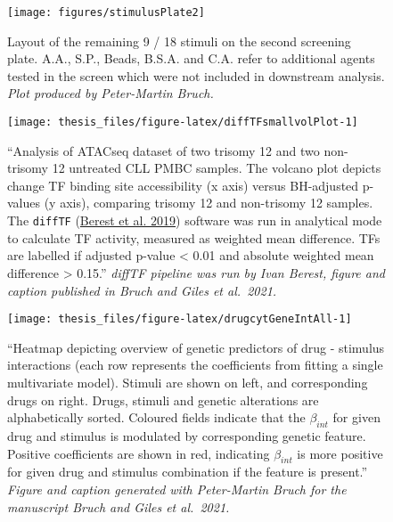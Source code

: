\documentclass[11pt, a4paper, twosided]{book}
\begin{document}
\begin{figure}

{\centering \texttt{[image: figures/stimulusPlate2]} 

}

\caption{Layout of the remaining 9 / 18 stimuli on the second screening plate. A.A., S.P., Beads, B.S.A. and C.A. refer to additional agents tested in the screen which were not included in downstream analysis. \emph{Plot produced by Peter-Martin Bruch.}}\label{fig:stimulusPlot2}
\end{figure}

\begin{figure}

{\centering \texttt{[image: thesis\_files/figure-latex/diffTFsmallvolPlot-1]} 

}

\caption{``Analysis of ATACseq dataset of two trisomy 12 and two non-trisomy 12 untreated CLL PMBC samples. The volcano plot depicts change TF binding site accessibility (x axis) versus BH-adjusted p-values (y axis), comparing trisomy 12 and non-trisomy 12 samples. The \texttt{diffTF} (\protect\hyperlink{ref-Berest2019}{Berest et al. 2019}) software was run in analytical mode to calculate TF activity, measured as weighted mean difference. TFs are labelled if adjusted p-value \textless{} 0.01 and absolute weighted mean difference \textgreater{} 0.15.'' \emph{diffTF pipeline was run by Ivan Berest, figure and caption published in Bruch and Giles et al.~2021.}}\label{fig:diffTFsmallvolPlot}
\end{figure}
\newpage


\begin{figure}

{\centering \texttt{[image: thesis\_files/figure-latex/drugcytGeneIntAll-1]} 

}

\caption{``Heatmap depicting overview of genetic predictors of drug - stimulus interactions (each row represents the coefficients from fitting a single multivariate model). Stimuli are shown on left, and corresponding drugs on right. Drugs, stimuli and genetic alterations are alphabetically sorted. Coloured fields indicate that the \(\beta_{int}\) for given drug and stimulus is modulated by corresponding genetic feature. Positive coefficients are shown in red, indicating \(\beta_{int}\) is more positive for given drug and stimulus combination if the feature is present.'' \emph{Figure and caption generated with Peter-Martin Bruch for the manuscript Bruch and Giles et al.~2021.}}\label{fig:drugcytGeneIntAll}
\end{figure}
\newpage
\end{document}
